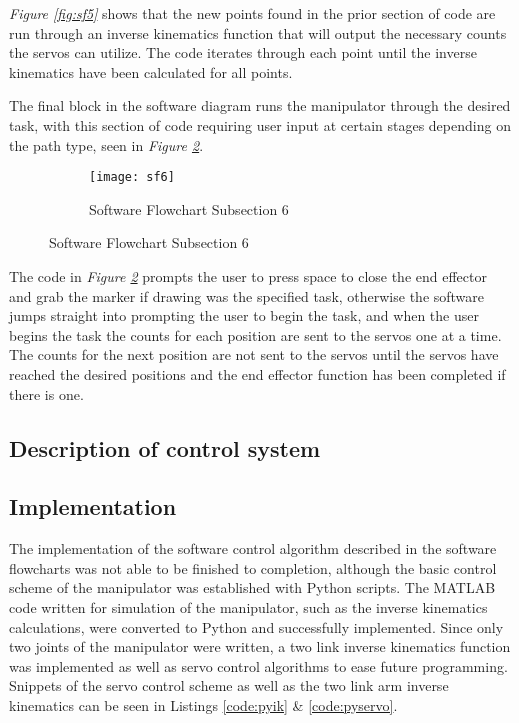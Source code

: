 \emph{Figure \ref{fig:sf5}} shows that the new points found in the prior section of code are run through an inverse kinematics function that will output the necessary counts the servos can utilize. The code iterates through each point until the inverse kinematics have been calculated for all points.

The final block in the software diagram runs the manipulator through the desired task, with this section of code requiring user input at certain stages depending on the path type, seen in \emph{Figure \ref{fig:sf6}}.
\begin{figure}[htp] \ContinuedFloat
  \begin{subfigure}[c]{\textwidth}
  \center
  \texttt{[image: sf6]}
  \caption{Software Flowchart Subsection 6}
  \label{fig:sf6}
  \end{subfigure}
\end{figure}

The code in \emph{Figure \ref{fig:sf6}} prompts the user to press space to close the end effector and grab the marker if drawing was the specified task, otherwise the software jumps straight into prompting the user to begin the task, and when the user begins the task the counts for each position are sent to the servos one at a time. The counts for the next position are not sent to the servos until the servos have reached the desired positions and the end effector function has been completed if there is one.

\subsection*{Description of control system}
\subsection*{Implementation}
The implementation of the software control algorithm described in the software flowcharts was not able to be finished to completion, although the basic control scheme of the manipulator was established with Python scripts. The MATLAB code written for simulation of the manipulator, such as the inverse kinematics calculations, were converted to Python and successfully implemented. Since only two joints of the manipulator were written, a two link inverse kinematics function was implemented as well as servo control algorithms to ease future programming. Snippets of the servo control scheme as well as the two link arm inverse kinematics can be seen in Listings \ref{code:pyik} \& \ref{code:pyservo}.

